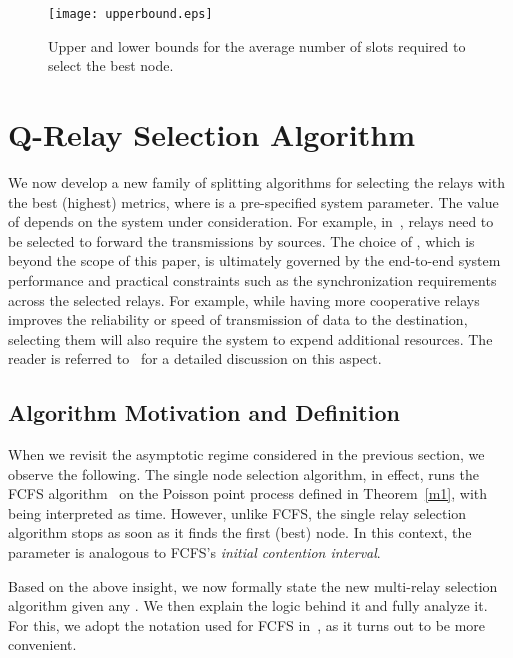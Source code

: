 \documentclass[12pt,draftcls,peerreview, onecolumn]{IEEEtran}
\begin{document}
\begin{figure}
  \centering \texttt{[image: upperbound.eps]}
                \caption{Upper and lower bounds for the average number of slots required to select the best node.}
        \label{fig:upperbounds}
\end{figure}


\section{Q-Relay Selection Algorithm}
\label{sec:Q-Relay Selection Algorithm}

We now develop a new family of splitting algorithms for selecting the
relays with the  best (highest) metrics, where  is a
pre-specified system parameter. The value of  depends on the system
under consideration. For example, in~\cite{ding_TWC_2009}, 
relays need to be selected to forward the transmissions by 
sources.  The choice of , which is beyond the scope of this paper,
is ultimately governed by the end-to-end system performance and
practical constraints such as the synchronization requirements across
the selected relays. For example, while having more cooperative relays
improves the reliability or speed of transmission of data to the
destination, selecting them will also require the system to expend
additional resources. The reader is referred
to~\cite{nam_CISS_2008,madan_TWC_2008,lo_VT_2009_SubsetSelection,shah_globecom_2009}
for a detailed discussion on this aspect.




\subsection{Algorithm Motivation and Definition}
\label{subsec:Q-algo defiition}

When we revisit the asymptotic regime considered in the previous
section, we observe the following.  The single node selection
algorithm, in effect, runs the FCFS
algorithm~\cite{bertsekas_gallager} on the Poisson point process
 defined in Theorem~\ref{m1}, with  being interpreted as
time.  However, unlike FCFS, the single relay selection algorithm
stops as soon as it finds the first (best) node.  In this context, the
parameter  is analogous to FCFS's {\em initial contention
  interval}.


Based on the above insight, we now formally state the new multi-relay
selection algorithm given any . We then explain the logic behind it
and fully analyze it.  For this, we adopt the notation used for FCFS
in~\cite{bertsekas_gallager}, as it turns out to be more convenient.
\end{document}
